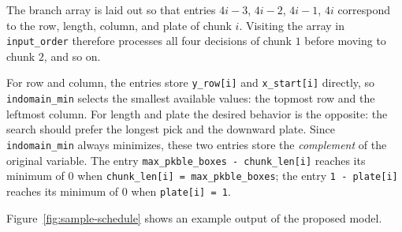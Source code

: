 The branch array is laid out so that entries \(4i-3\), \(4i-2\),
\(4i-1\), \(4i\) correspond to the row, length, column, and plate of
chunk \(i\). Visiting the array in \texttt{input\_order} therefore
processes all four decisions of chunk \(1\) before moving to chunk
\(2\), and so on.

For row and column, the entries store \texttt{y\_row[i]} and
\texttt{x\_start[i]} directly, so \texttt{indomain\_min} selects the
smallest available values: the topmost row and the leftmost column. For
length and plate the desired behavior is the opposite: the search should
prefer the longest pick and the downward plate. Since \texttt{indomain\_min}
always minimizes, these two entries store the \emph{complement} of the
original variable. The entry \texttt{max\_pkble\_boxes - chunk\_len[i]}
reaches its minimum of \(0\) when \texttt{chunk\_len[i] = max\_pkble\_boxes};
the entry \texttt{1 - plate[i]} reaches its minimum of \(0\) when
\texttt{plate[i] = 1}.

Figure~\ref{fig:sample-schedule} shows an example output of the proposed model.


